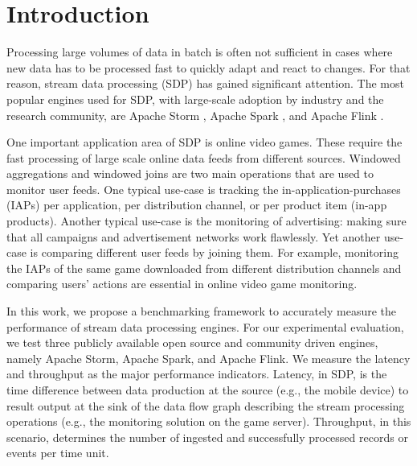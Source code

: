\section{Introduction}
Processing large volumes of data in batch is often not sufficient in cases where new data has to be processed fast to quickly adapt and react to changes. For that reason, stream data processing (SDP) has gained significant attention. The most popular engines used for SDP, with large-scale adoption by industry and the research community, are Apache Storm \cite{toshniwal2014storm}, Apache Spark  \cite{zaharia2012discretized}, and Apache Flink \cite{carbone2015apache}. 


One  important application area of SDP is  online video games. These require the fast processing  of large scale online data feeds  from different sources. Windowed aggregations and windowed joins are two main operations that are used to monitor user feeds. One typical use-case is tracking the in-application-purchases (IAPs) per application, per distribution channel, or per product item (in-app products). Another typical use-case is the monitoring of advertising:  making sure that all campaigns and advertisement networks work flawlessly. Yet another use-case is comparing different user feeds by  joining them. For example, monitoring the IAPs of the same game downloaded from different distribution channels and comparing users'  actions  are essential in  online video game monitoring.



In this work, we propose a benchmarking framework to accurately measure the performance of stream data processing engines. For our experimental evaluation, we test three publicly available open source and community driven engines, namely Apache Storm, Apache Spark, and Apache Flink.  
We measure the latency and throughput as the major performance indicators. Latency, in SDP, is the time difference between data production at the source (e.g., the mobile device) to result output at the sink of the data flow graph describing the stream processing operations (e.g., the monitoring solution on the game server). Throughput, in this scenario, determines the number of ingested and successfully processed records or events per time unit.

